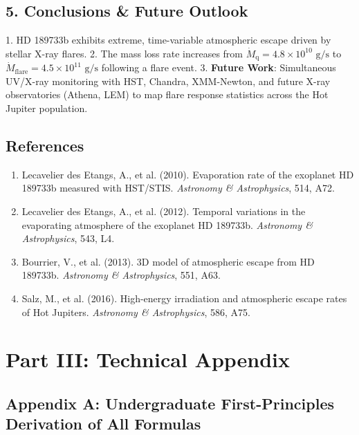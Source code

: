 \documentclass[11pt,a4paper]{article}
\begin{document}
\subsection*{5. Conclusions \& Future Outlook}
1. HD 189733b exhibits extreme, time-variable atmospheric escape driven by stellar X-ray flares.
2. The mass loss rate increases from $\dot{M}_{\text{q}} = 4.8 \times 10^{10}\text{ g/s}$ to $\dot{M}_{\text{flare}} = 4.5 \times 10^{11}\text{ g/s}$ following a flare event.
3. \textbf{Future Work}: Simultaneous UV/X-ray monitoring with HST, Chandra, XMM-Newton, and future X-ray observatories (Athena, LEM) to map flare response statistics across the Hot Jupiter population.

\subsection*{References}
\begin{enumerate}
    \item Lecavelier des Etangs, A., et al. (2010). Evaporation rate of the exoplanet HD 189733b measured with HST/STIS. \textit{Astronomy \& Astrophysics}, 514, A72.
    \item Lecavelier des Etangs, A., et al. (2012). Temporal variations in the evaporating atmosphere of the exoplanet HD 189733b. \textit{Astronomy \& Astrophysics}, 543, L4.
    \item Bourrier, V., et al. (2013). 3D model of atmospheric escape from HD 189733b. \textit{Astronomy \& Astrophysics}, 551, A63.
    \item Salz, M., et al. (2016). High-energy irradiation and atmospheric escape rates of Hot Jupiters. \textit{Astronomy \& Astrophysics}, 586, A75.
\end{enumerate}

\newpage

\section*{Part III: Technical Appendix}

\subsection*{Appendix A: Undergraduate First-Principles Derivation of All Formulas}
\end{document}

